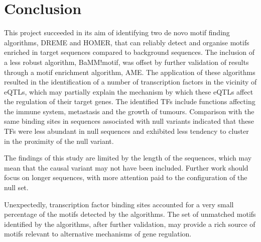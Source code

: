 \documentclass[12pt]{article}
\begin{document}
\section{Conclusion}

This project succeeded in its aim of identifying two de novo motif finding algorithms, DREME and HOMER, that can reliably detect and organise motifs enriched in target sequences compared to background sequences. The inclusion of a less robust algorithm, BaMM!motif, was offset by further validation of results through a motif enrichment algorithm, AME. The application of these algorithms resulted in the identification of a number of transcription factors in the vicinity of eQTLs, which may partially explain the mechanism by which these eQTLs affect the regulation of their target genes. The identified TFs include functions affecting the immune system, metastasis and the growth of tumours. Comparison with the same binding sites in sequences associated with null variants indicated that these TFs were less abundant in null sequences and exhibited less tendency to cluster in the proximity of the null variant. 

The findings of this study are limited by the length of the sequences, which may mean that the causal variant may not have been included. Further work should focus on longer sequences, with more attention paid to the configuration of the null set.

Unexpectedly, transcription factor binding sites accounted for a very small percentage of the motifs detected by the algorithms. The set of unmatched motifs identified by the algorithms, after further validation, may provide a rich source of motifs relevant to alternative mechanisms of gene regulation.
\end{document}
